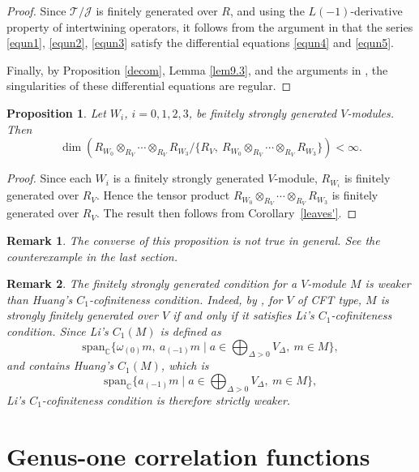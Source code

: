 \documentclass[9pt]{amsart}
\newtheorem{proposition}{Proposition}[section]
\newtheorem{remark}{Remark}[section]
\newcommand{\T}{\mathcal{T}}
\newcommand{\J}{\mathcal{J}}
\begin{document}
\begin{proof}
Since $\T/\J$ is finitely generated over $R$, and using the $L(-1)$-derivative property of intertwining operators, it follows from the argument in \cite[Theorem 1.4]{huang2005differential1} that the series \eqref{equn1}, \eqref{equn2}, \eqref{equn3} satisfy the differential equations \eqref{equn4} and \eqref{equn5}.

Finally, by Proposition \ref{decom}, Lemma \ref{lem9.3}, and the arguments in \cite[Theorem 2.3]{huang2005differential1}, the singularities of these differential equations are regular.
\end{proof}



\begin{proposition}
Let $W_i$, $i = 0, 1, 2, 3$, be finitely strongly generated $V$-modules. Then
\[
\dim \left( R_{W_0} \otimes_{R_V} \cdots \otimes_{R_V} R_{W_3} \Big/ \{ R_V,\ R_{W_0} \otimes_{R_V} \cdots \otimes_{R_V} R_{W_3} \} \right) < \infty.
\]
\end{proposition}

\begin{proof}
Since each $W_i$ is a finitely strongly generated $V$-module, $R_{W_i}$ is finitely generated over $R_V$. Hence the tensor product $R_{W_0} \otimes_{R_V} \cdots \otimes_{R_V} R_{W_3}$ is finitely generated over $R_V$. The result then follows from Corollary~\ref{leaves'}.
\end{proof}

\begin{remark}
The converse of this proposition is not true in general. See the counterexample in the last section.
\end{remark}

\begin{remark}
The finitely strongly generated condition for a $V$-module $M$ is weaker than Huang's $C_1$-cofiniteness condition. Indeed, by \cite{arakawa2012remark}, for $V$ of CFT type, $M$ is strongly finitely generated over $V$ if and only if it satisfies Li's $C_1$-cofiniteness condition. Since Li's $C_1(M)$ is defined as
\[
\mathrm{span}_{\mathbb{C}} \{ \omega_{(0)}m,\ a_{(-1)}m \mid a \in \bigoplus_{\Delta > 0} V_\Delta,\ m \in M \},
\]
and contains Huang's $C_1(M)$, which is
\[
\mathrm{span}_{\mathbb{C}} \{ a_{(-1)}m \mid a \in \bigoplus_{\Delta > 0} V_\Delta,\ m \in M \},
\]
Li's $C_1$-cofiniteness condition is therefore strictly weaker.
\end{remark}



\section{Genus-one correlation functions}
\end{document}
